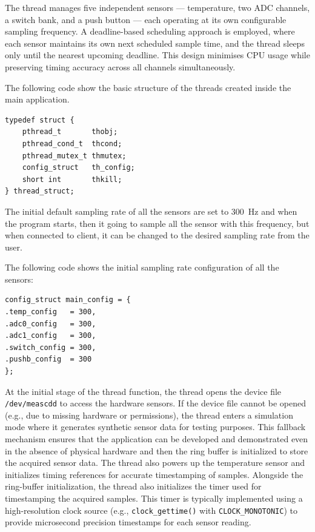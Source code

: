 The thread manages five independent sensors --- temperature, two ADC channels, a switch bank, and a push button --- each operating at its own configurable sampling frequency. A deadline-based scheduling approach is employed, where each sensor maintains its own next scheduled sample time, and the thread sleeps only until the nearest upcoming deadline. This design minimises CPU usage while preserving timing accuracy across all channels simultaneously.

The following code show the basic structure of the threads created inside the main application. 
\begin{verbatim}
typedef struct {
	pthread_t       thobj;
	pthread_cond_t  thcond;
	pthread_mutex_t thmutex;
	config_struct   th_config;
	short int       thkill;
} thread_struct;
\end{verbatim}

The initial default sampling rate of all the sensors are set to \SI{300}{\hertz} and when the program starts, then it going to sample all the sensor with this frequency, but when connected to client, it can be changed to the desired sampling rate from the user. 

The following code shows the initial sampling rate configuration of all the sensors: 
\begin{verbatim}
config_struct main_config = {
.temp_config   = 300,
.adc0_config   = 300,
.adc1_config   = 300,
.switch_config = 300,
.pushb_config  = 300
};
\end{verbatim}

At the initial stage of the thread function, the thread opens the device file \texttt{/dev/meascdd} to access the hardware sensors. If the device file cannot be opened (e.g., due to missing hardware or permissions), the thread enters a simulation mode where it generates synthetic sensor data for testing purposes. This fallback mechanism ensures that the application can be developed and demonstrated even in the absence of physical hardware and then the ring buffer is initialized to store the acquired sensor data. The thread also powers up the temperature sensor and initializes timing references for accurate timestamping of samples. Alongside the ring-buffer initialization, the thread also initializes the timer used for timestamping the acquired samples. This timer is typically implemented using a high-resolution clock source (e.g., \texttt{clock\_gettime()} with \texttt{CLOCK\_MONOTONIC}) to provide microsecond precision timestamps for each sensor reading.


